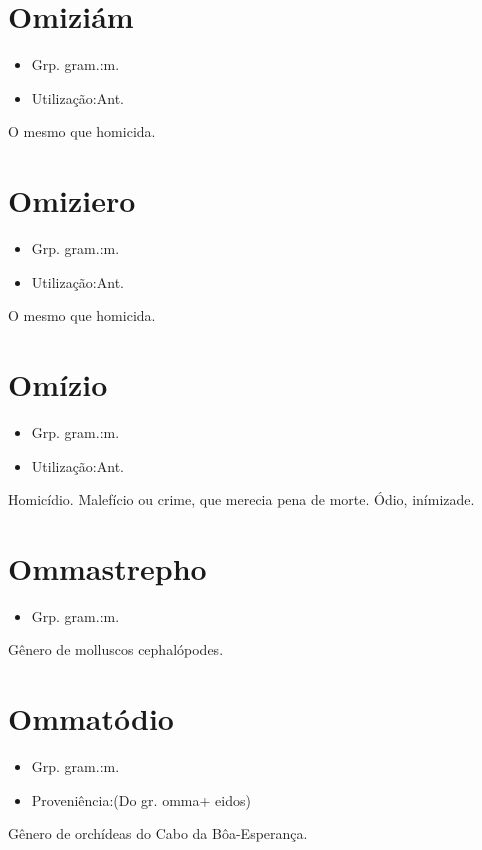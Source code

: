 \section{Omiziám}
\begin{itemize}
\item {Grp. gram.:m.}
\end{itemize}
\begin{itemize}
\item {Utilização:Ant.}
\end{itemize}
O mesmo que \textunderscore homicida\textunderscore .
\section{Omiziero}
\begin{itemize}
\item {Grp. gram.:m.}
\end{itemize}
\begin{itemize}
\item {Utilização:Ant.}
\end{itemize}
O mesmo que \textunderscore homicida\textunderscore .
\section{Omízio}
\begin{itemize}
\item {Grp. gram.:m.}
\end{itemize}
\begin{itemize}
\item {Utilização:Ant.}
\end{itemize}
Homicídio.
Malefício ou crime, que merecia pena de morte.
Ódio, inímizade.
\section{Ommastrepho}
\begin{itemize}
\item {Grp. gram.:m.}
\end{itemize}
Gênero de molluscos cephalópodes.
\section{Ommatódio}
\begin{itemize}
\item {Grp. gram.:m.}
\end{itemize}
\begin{itemize}
\item {Proveniência:(Do gr. \textunderscore omma\textunderscore  + \textunderscore eidos\textunderscore )}
\end{itemize}
Gênero de orchídeas do Cabo da Bôa-Esperança.
